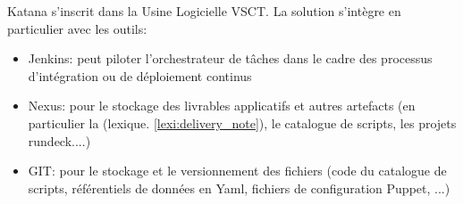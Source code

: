 Katana s'inscrit dans la Usine Logicielle VSCT. La solution s'intègre en particulier avec les outils:
\begin{itemize}
 \item Jenkins: peut piloter l'orchestrateur de tâches dans le cadre des processus d'intégration ou de déploiement continus
 \item Nexus: pour le stockage des livrables applicatifs et autres artefacts (en particulier la (lexique. \ref{lexi:delivery_note}), le catalogue de scripts, les projets rundeck....)
 \item GIT: pour le stockage et le versionnement des fichiers (code du catalogue de scripts, référentiels de données en Yaml, fichiers de configuration Puppet, ...)
\end{itemize}
